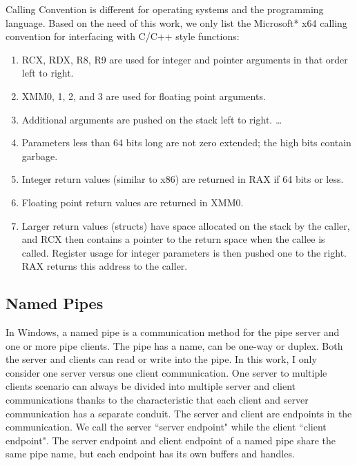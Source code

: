 Calling Convention is different for operating systems and the programming language. Based on the need of this work, we only list the Microsoft* x64 calling convention for interfacing with C/C++ style functions:\par
\begin{enumerate}  
\item RCX, RDX, R8, R9 are used for integer and pointer arguments in that order left to right.
\item XMM0, 1, 2, and 3 are used for floating point arguments.
\item Additional arguments are pushed on the stack left to right. \ldots 
\item Parameters less than 64 bits long are not zero extended; the high bits contain garbage.
\item Integer return values (similar to x86) are returned in RAX if 64 bits or less.
\item Floating point return values are returned in XMM0.
\item Larger return values (structs) have space allocated on the stack by the caller, and RCX then contains a pointer to the return space when the callee is called. Register usage for integer parameters is then pushed one to the right. RAX returns this address to the caller.
\end{enumerate}

\subsection{Named Pipes}
In Windows, a named pipe is a communication method for the pipe server and one or more pipe clients. The pipe has a name, can be one-way or duplex. Both the server and clients can read or write into the pipe.\cite{WinNamedpipe} In this work, I only consider one server versus one client communication. One server to multiple clients scenario can always be divided into multiple server and client communications thanks to the characteristic that each client and server communication has a separate conduit. The server and client are endpoints in the communication. We call the server ``server endpoint" while the client ``client endpoint".  The server endpoint and client endpoint of a named pipe share the same pipe name, but each endpoint has its own buffers and handles. 

